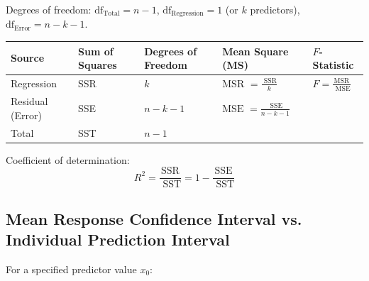 \documentclass[
]{article}
\begin{document}
Degrees of freedom: \(\text{df}_{\text{Total}} = n - 1\),
\(\text{df}_{\text{Regression}} = 1\) (or \(k\) predictors),
\(\text{df}_{\text{Error}} = n - k - 1\).

{\def\LTcaptype{none} %
\begin{longtable}[]{@{}
  >{\centering\arraybackslash}p{}
  >{\centering\arraybackslash}p{}
  >{\centering\arraybackslash}p{}
  >{\centering\arraybackslash}p{}
  >{\centering\arraybackslash}p{}@{}}
\toprule\noalign{}
\begin{minipage}[b]{\linewidth}\centering
\textbf{Source}
\end{minipage} & \begin{minipage}[b]{\linewidth}\centering
\textbf{Sum of Squares}
\end{minipage} & \begin{minipage}[b]{\linewidth}\centering
\textbf{Degrees of Freedom}
\end{minipage} & \begin{minipage}[b]{\linewidth}\centering
\textbf{Mean Square (MS)}
\end{minipage} & \begin{minipage}[b]{\linewidth}\centering
\textbf{\(F\)-Statistic}
\end{minipage} \\
\midrule\noalign{}
\endhead
\bottomrule\noalign{}
\endlastfoot
Regression & SSR & \(k\) & \(\text{MSR } = \frac{\text{ SSR}}{k}\) &
\(F = \frac{\text{MSR}}{\text{ MSE}}\) \\
Residual (Error) & SSE & \(n - k - 1\) &
\(\text{MSE } = \frac{\text{ SSE}}{n - k - 1}\) & \\
Total & SST & \(n - 1\) & & \\
\end{longtable}
}

Coefficient of determination:
\[R^{2} = \frac{\text{SSR}}{\text{ SST}} = 1 - \frac{\text{SSE}}{\text{ SST}}\]

\textbf{ }

\subsection{Mean Response Confidence Interval vs. Individual Prediction
Interval}

For a specified predictor value \(x_{0}\):
\end{document}
